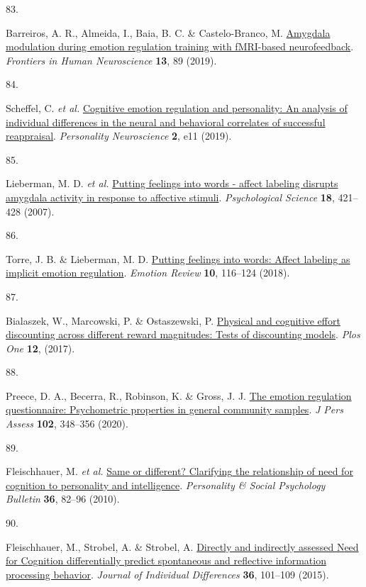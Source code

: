 \documentclass[
  man,floatsintext]{apa6}
\newlength{\cslhangindent}
\newlength{\csllabelwidth}
\newlength{\cslentryspacingunit} %
\newenvironment{CSLReferences}[2] %
 {%
  \setlength{\parindent}{0pt}
  \ifodd #1
  \let\oldpar\par
  \def\par{\hangindent=\cslhangindent\oldpar}
  \fi
  \setlength{\parskip}{#2\cslentryspacingunit}
 }%
 {}
\newcommand{\CSLLeftMargin}[1]{\parbox[t]{\csllabelwidth}{#1}}
\newcommand{\CSLRightInline}[1]{\parbox[t]{\linewidth - \csllabelwidth}{#1}\break}
\begin{document}
\begin{CSLReferences}{0}{0}
\leavevmode{}%
\CSLLeftMargin{83. }%
\CSLRightInline{Barreiros, A. R., Almeida, I., Baia, B. C. \& Castelo-Branco, M. \href{https://doi.org/10.3389/fnhum.2019.00089}{Amygdala modulation during emotion regulation training with fMRI-based neurofeedback}. \emph{Frontiers in Human Neuroscience} \textbf{13}, 89 (2019).}

\leavevmode{}%
\CSLLeftMargin{84. }%
\CSLRightInline{Scheffel, C. \emph{et al.} \href{https://doi.org/10.1017/pen.2019.11}{Cognitive emotion regulation and personality: An analysis of individual differences in the neural and behavioral correlates of successful reappraisal}. \emph{Personality Neuroscience} \textbf{2}, e11 (2019).}

\leavevmode{}%
\CSLLeftMargin{85. }%
\CSLRightInline{Lieberman, M. D. \emph{et al.} \href{https://doi.org/10.1111/j.1467-9280.2007.01916.x}{Putting feelings into words - affect labeling disrupts amygdala activity in response to affective stimuli}. \emph{Psychological Science} \textbf{18}, 421--428 (2007).}

\leavevmode{}%
\CSLLeftMargin{86. }%
\CSLRightInline{Torre, J. B. \& Lieberman, M. D. \href{https://doi.org/10.1177/1754073917742706}{Putting feelings into words: Affect labeling as implicit emotion regulation}. \emph{Emotion Review} \textbf{10}, 116--124 (2018).}

\leavevmode{}%
\CSLLeftMargin{87. }%
\CSLRightInline{Bialaszek, W., Marcowski, P. \& Ostaszewski, P. \href{https://doi.org/ARTN\%20e0182353\%0A10.1371/journal.pone.0182353}{Physical and cognitive effort discounting across different reward magnitudes: Tests of discounting models}. \emph{Plos One} \textbf{12}, (2017).}

\leavevmode{}%
\CSLLeftMargin{88. }%
\CSLRightInline{Preece, D. A., Becerra, R., Robinson, K. \& Gross, J. J. \href{https://doi.org/10.1080/00223891.2018.1564319}{The emotion regulation questionnaire: Psychometric properties in general community samples}. \emph{J Pers Assess} \textbf{102}, 348--356 (2020).}

\leavevmode{}%
\CSLLeftMargin{89. }%
\CSLRightInline{Fleischhauer, M. \emph{et al.} \href{https://doi.org/10.1177/0146167209351886}{Same or different? {Clarifying} the relationship of need for cognition to personality and intelligence}. \emph{Personality \& Social Psychology Bulletin} \textbf{36}, 82--96 (2010).}

\leavevmode{}%
\CSLLeftMargin{90. }%
\CSLRightInline{Fleischhauer, M., Strobel, A. \& Strobel, A. \href{https://doi.org/10.1027/1614-0001/a000161}{Directly and indirectly assessed {N}eed for {C}ognition differentially predict spontaneous and reflective information processing behavior}. \emph{Journal of Individual Differences} \textbf{36}, 101--109 (2015).}

\end{CSLReferences}
\end{document}
